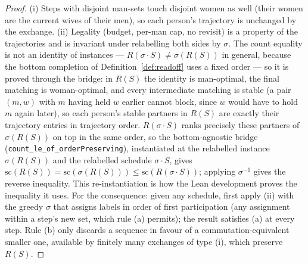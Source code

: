 \documentclass[11pt]{article}
\begin{document}
\begin{proof}
(i) Steps with disjoint man-sets touch disjoint women as well (their women are the
current wives of their men), so each person's trajectory is unchanged by the exchange.
(ii) Legality (budget, per-man cap, no revisit) is a property of the trajectories and is
invariant under relabelling both sides by $\sigma$. The count equality is not an identity
of instances --- $R(\sigma\cdot S)\ne\sigma(R(S))$ in general, because the bottom
completion of Definition~\ref{def:readoff} uses a fixed order --- so it is proved through
the bridge: in $R(S)$ the identity is man-optimal, the final matching is woman-optimal,
and every intermediate matching is stable (a pair $(m,w)$ with $m$ having held $w$
earlier cannot block, since $w$ would have to hold $m$ again later), so each person's
stable partners in $R(S)$ are exactly their trajectory entries in trajectory order.
$R(\sigma\cdot S)$ ranks precisely these partners of $\sigma(R(S))$ on top in the same
order, so the bottom-agnostic bridge (\texttt{count\_le\_of\_orderPreserving}),
instantiated at the relabelled instance $\sigma(R(S))$ and the relabelled schedule
$\sigma\cdot S$, gives $\mathrm{sc}(R(S))=\mathrm{sc}(\sigma(R(S)))\le
\mathrm{sc}(R(\sigma\cdot S))$; applying $\sigma^{-1}$ gives the reverse inequality.
This re-instantiation is how the Lean development proves the inequality it uses.
For the consequence: given any schedule, first apply (ii) with the
greedy $\sigma$ that assigns labels in order of first participation (any assignment
within a step's new set, which rule (a) permits); the result satisfies (a) at every
step. Rule (b) only discards a sequence in favour of a commutation-equivalent
smaller one, available by finitely many exchanges of type (i), which preserve
$R(S)$.
\end{proof}
\end{document}

